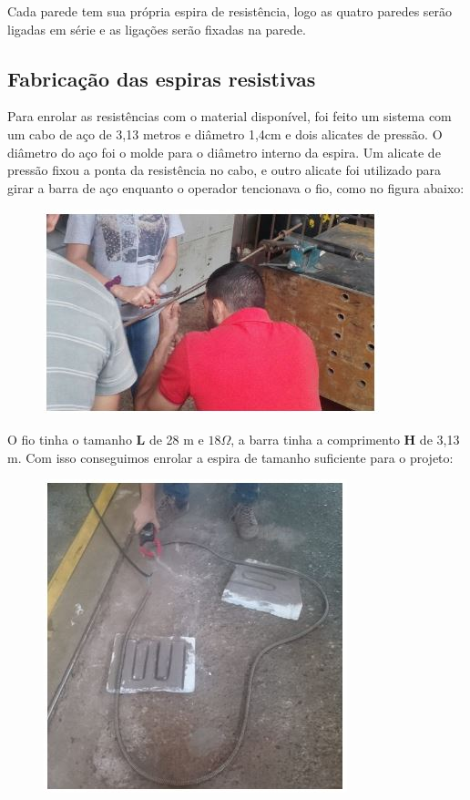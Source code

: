 Cada parede tem sua própria espira de resistência, logo as quatro paredes serão ligadas em série e as ligações serão fixadas na parede.

\subsection{Fabricação das espiras resistivas}
Para enrolar as resistências com o material disponível, foi feito um sistema com um cabo de aço de 3,13 metros e diâmetro 1,4cm e dois alicates de pressão. O diâmetro do aço foi o molde para o diâmetro interno da espira. Um alicate de pressão fixou a ponta da resistência no cabo, e outro alicate foi utilizado para girar a barra de aço enquanto o operador tencionava o fio, como no figura abaixo:
\begin{figure}[ht]
	\centering
	\label{foto1}
	\includegraphics[keepaspectratio=true,scale=1.0]{figuras/alimentacao6.JPG}
\end{figure}

O fio tinha o tamanho \textbf{L} de 28 m e $18\Omega$, a barra tinha a comprimento \textbf{H} de 3,13 m. Com isso conseguimos enrolar a espira de tamanho suficiente para o projeto:
\begin{figure}[ht]
	\centering
	\label{foto2}
	\includegraphics[keepaspectratio=true,scale=1.0]{figuras/alimentacao7.JPG}
\end{figure}

